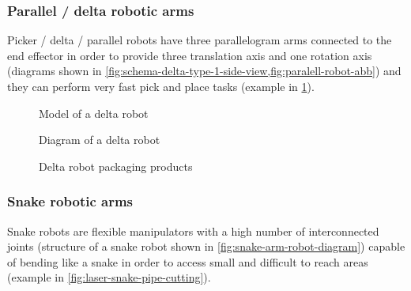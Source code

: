 \subsubsection{Parallel / delta robotic arms}

Picker / delta / parallel robots have three parallelogram arms connected to the end effector in order to provide three translation axis and one rotation axis (diagrams shown in \cref{fig:schema-delta-type-1-side-view,fig:paralell-robot-abb}) and they can perform very fast pick and place tasks (example in \cref{fig:picker-parallel-robot-fanuc}).

\begin{figure}[H]
	\begin{floatrow}[2]
		{\caption[Model of a delta robot]{Model of a delta robot\protect\footnotemark}\label{fig:paralell-robot-abb}}
		{\caption[Diagram of a delta robot]{Diagram of a delta robot\protect\footnotemark}\label{fig:schema-delta-type-1-side-view}}
		{\caption[Delta robot packaging products]{Delta robot packaging products\protect\footnotemark}\label{fig:picker-parallel-robot-fanuc}}
	\end{floatrow}
\end{figure}


\subsubsection{Snake robotic arms}

Snake robots are flexible manipulators with a high number of interconnected joints (structure of a snake robot shown in \cref{fig:snake-arm-robot-diagram}) capable of bending like a snake in order to access small and difficult to reach areas (example in \cref{fig:laser-snake-pipe-cutting}).


